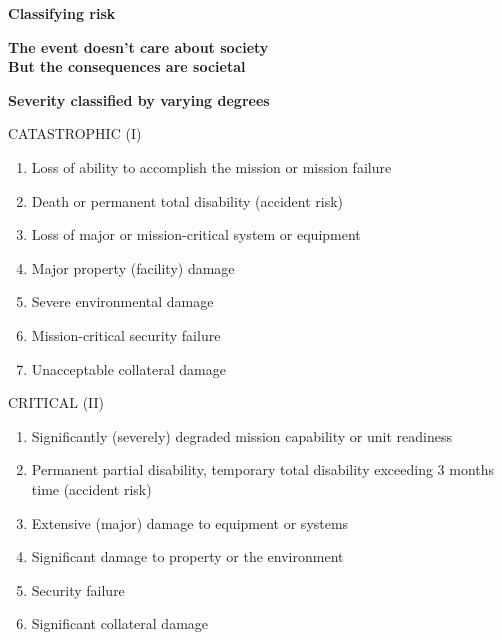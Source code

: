 \documentclass[aspectratio=1610,pdftex,dvipsnames,compress,xcolor={dvipsnames}]{beamer}
\begin{document}
\begin{frame}[plain]{}
    \centering\LARGE\textbf{Classifying risk}
\end{frame}


\begin{frame}[plain]{}
    \centering\Large\textbf{The event doesn't care about society}\\
    \centering\Large\textbf{But the consequences are societal}
\end{frame}


\begin{frame}[plain]{}
    \centering\Large\textbf{Severity classified by varying degrees}
\end{frame}


\addtocounter{framenumber}{-3}
\begin{frame}{CATASTROPHIC (I)}
    \begin{enumerate}[series=outerlist,topsep=0pt,itemsep=15pt,leftmargin=*,label=(\arabic*)]
        \item[]Loss of ability to accomplish the mission or mission failure
        \item[]Death or permanent total disability (accident risk)
        \item[]Loss of major or mission-critical system or equipment
        \item[]Major property (facility) damage
        \item[]Severe environmental damage
        \item[]Mission-critical security failure 
        \item[]Unacceptable collateral damage
    \end{enumerate}
\end{frame}


\begin{frame}{CRITICAL (II)}
    \begin{enumerate}[series=outerlist,topsep=0pt,itemsep=15pt,leftmargin=*,label=(\arabic*)]
        \item[]Significantly (severely) degraded mission capability or unit readiness
        \item[]Permanent partial disability, temporary total disability exceeding 3 months time (accident risk)
        \item[]Extensive (major) damage to equipment or systems
        \item[]Significant damage to property or the environment
        \item[]Security failure
        \item[]Significant collateral damage
    \end{enumerate}
\end{frame}
\end{document}
